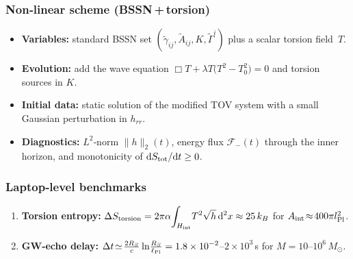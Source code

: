 \documentclass{article}
\begin{document}
\subsubsection{Non‑linear scheme (BSSN\,+\,torsion)}
\begin{itemize}
\item \textbf{Variables:} standard BSSN set 
$(\tilde\gamma_{ij},\tilde A_{ij},K,\tilde\Gamma^{i})$ plus a scalar torsion field~$T$.
\item \textbf{Evolution:} add the wave equation
$\Box T +\lambda T\bigl(T^{2}-T_{0}^{2}\bigr)=0$ and torsion
sources in $K$.
\item \textbf{Initial data:} static solution of the modified TOV system with
a small Gaussian perturbation in $h_{rr}$.
\item \textbf{Diagnostics:} $L^{2}$‑norm $\|h\|_{2}(t)$, energy flux
$\mathcal F_{-}(t)$ through the inner horizon, and monotonicity of
$\mathrm dS_{\rm tot}/\mathrm dt\ge0$.
\end{itemize}

\subsubsection{Laptop‑level benchmarks}
\begin{enumerate}[label=(\alph*)]
\item \textbf{Torsion entropy:}
$\displaystyle\Delta S_{\rm torsion}=2\pi\alpha\!\int_{H_{\rm int}}\!T^{2}\sqrt{h}\,{\rm d}^{2}x
\approx25\,k_{B}$ for $A_{\rm int}\!\approx\!400\pi l_{\rm Pl}^{2}$.
\item \textbf{GW‑echo delay:}
$\displaystyle\Delta t\!\simeq\!\tfrac{2R_{S}}{c}\ln\!\tfrac{R_{S}}{\ell_{\rm Pl}}
=1.8\times10^{-2}$–$2\times10^{3}\,$s for
$M=10$–$10^{6}\,M_{\odot}$.
\end{enumerate}

\end{document}
